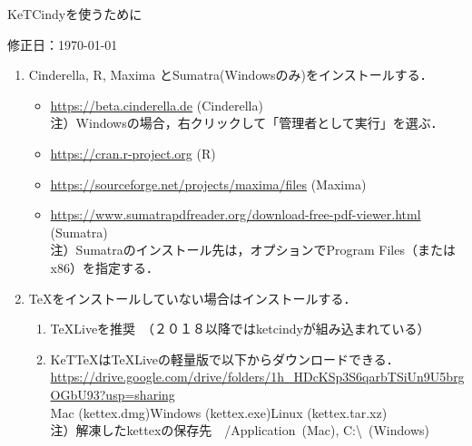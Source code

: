 \documentclass{ujarticle}
\begin{document}
\begin{center}
KeTCindyを使うために
\end{center}

\vspace{-5mm}

\hfill 修正日：\today

\begin{enumerate}[\bf\large 1.]
\item Cinderella, R, Maxima とSumatra(Windowsのみ)をインストールする．\vspace{-2mm}

 \begin{itemize}
 \item \url{https://beta.cinderella.de}  (Cinderella)\\
\hspace*{6mm}注）Windowsの場合，右クリックして「管理者として実行」を選ぶ．
 \item \url{https://cran.r-project.org}   (R)
 \item \url{https://sourceforge.net/projects/maxima/files}  (Maxima)
 \item \url{https://www.sumatrapdfreader.org/download-free-pdf-viewer.html} (Sumatra)\\
\hspace*{6mm}注）Sumatraのインストール先は，オプションでProgram Files（またはx86）を指定する．

 \end{itemize}
\item TeXをインストールしていない場合はインストールする．\vspace{-2mm}
 \begin{enumerate}[(1)]
 \item TeXLiveを推奨　（２０１８以降ではketcindyが組み込まれている）
 \item KeTTeXはTeXLiveの軽量版で以下からダウンロードできる．\\
\hspace*{3mm}\url{https://drive.google.com/drive/folders/1h_HDcKSp3S6qarbTSiUn9U5brgOGbU93?usp=sharing}\\
\hspace*{12mm}Mac (kettex.dmg)\hspace{3mm}Windows (kettex.exe)\hspace*{3mm}Linux (kettex.tar.xz)\\
    \hspace*{6mm}注）解凍したkettexの保存先　/Application\ (Mac), C:\textbackslash\ (Windows)


\end{enumerate}
\end{enumerate}
\end{document}
